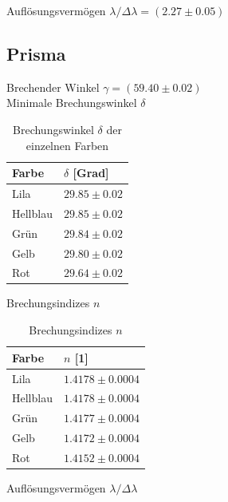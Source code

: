 \documentclass[12pt,a4paper,twoside]{article}
\begin{document}
\noindent
Auflösungsvermögen $\lambda / \Delta \lambda = (2.27 \pm 0.05)$

\subsection{Prisma}
Brechender Winkel $\gamma = (59.40 \pm 0.02)$ \\
Minimale Brechungswinkel $\delta$ \\

\begin{table}[H]
    \centering
    \caption{Brechungswinkel $\delta$ der einzelnen Farben}
    \label{tab:zus delta scheiß}
    \begin{tabular}{| l | l |}
        \hline
        Farbe & $\delta$ [Grad] \\
        \hline
        Lila        & $ 29.85 \pm 0.02 $ \\
        Hellblau    & $ 29.85 \pm 0.02 $ \\
        Grün        & $ 29.84 \pm 0.02 $ \\
        Gelb        & $ 29.80 \pm 0.02 $ \\
        Rot         & $ 29.64 \pm 0.02 $ \\
        \hline
    \end{tabular}
\end{table}

\noindent
Brechungsindizes $n$ \\

\begin{table}[H]
    \centering
    \caption{Brechungsindizes $n$}
    \label{tab:zus delta n}
    \begin{tabular}{| l | l |}
        \hline
        Farbe & $n$ [1] \\
        \hline
        Lila        & $ 1.4178 \pm 0.0004 $ \\
        Hellblau    & $ 1.4178 \pm 0.0004 $ \\
        Grün        & $ 1.4177 \pm 0.0004 $ \\
        Gelb        & $ 1.4172 \pm 0.0004 $ \\
        Rot         & $ 1.4152 \pm 0.0004 $ \\
        \hline
    \end{tabular}
\end{table}

\noindent
Auflösungsvermögen $\lambda / \Delta \lambda$

\printbibliography[heading=bibintoc]
\end{document}
